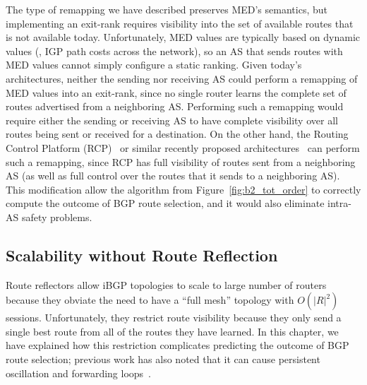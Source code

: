 The type of remapping we have described preserves MED's semantics,
but implementing an exit-rank requires visibility into the set of
available routes that is not available today.  Unfortunately, MED values
are typically based on dynamic values (\eg, IGP path costs across the
network), so an AS that sends routes with MED values cannot simply
configure a static 
ranking.  Given today's architectures, neither the sending nor receiving
AS could perform a remapping of MED values into an exit-rank, since no
single router learns the complete set of routes advertised from a
neighboring AS.  Performing such a remapping would require either the
sending or receiving AS to have complete visibility over all routes
being sent or received for a destination.  On the other hand, the
Routing Control Platform (RCP)~\cite{feamster:fdna2004} or similar
recently proposed architectures~\cite{id-versatile-rr} can perform such
a remapping, since RCP has full visibility of routes sent from a
neighboring AS (as well as full control over the routes that it sends to
a neighboring AS).
%
This modification allow the algorithm from Figure~\ref{fig:b2_tot_order}
to correctly compute 
the outcome of BGP route selection, and it would also eliminate intra-AS
safety problems.


\subsection{Scalability without Route Reflection} 



Route reflectors allow iBGP topologies to scale to large number of
routers because they obviate the need to have a ``full mesh''
topology with $O(|R|^2)$ sessions. Unfortunately, they restrict route
visibility 
because they only send a single best route from all of the routes they
have learned.  In this chapter, we have explained how this restriction
complicates predicting the outcome of BGP route selection; previous work
has also 
noted that it can cause persistent oscillation and forwarding
loops~\cite{Basu2002, Griffin2002}.   

